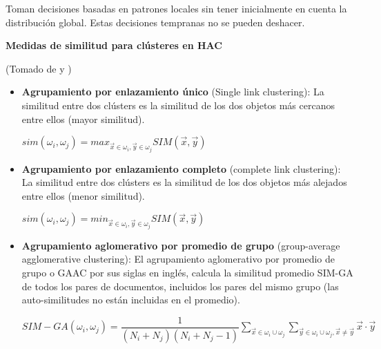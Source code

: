 \documentclass{llncs}
\begin{document}
Toman decisiones basadas en patrones locales sin tener inicialmente en cuenta la distribución global. Estas decisiones tempranas no se pueden deshacer.

\vspace{1em}
\textbf{Medidas de similitud para cl\'usteres en HAC}

\begin{flushright}
	\scriptsize*(Tomado de \cite{B1} y \cite{B3})
	\normalsize
\end{flushright}

\begin{itemize}
	\item \textbf{Agrupamiento por enlazamiento \'unico} (Single link clustering): La similitud entre dos cl\'usters es la similitud de los dos objetos más cercanos entre ellos (mayor similitud).
	
	\begin{center}
		$ sim(\omega_{i}, \omega_{j}) = max_{\overrightarrow{x} \in \omega_{i}, \overrightarrow{y} \in \omega_{j}} SIM(\overrightarrow{x}, \overrightarrow{y})$
	\end{center}
	
	\vspace{1em}
	\item \textbf{Agrupamiento por enlazamiento completo} (complete link clustering): La similitud entre dos cl\'usters es la similitud de los dos objetos más alejados entre ellos (menor similitud). 
	
	\begin{center}
		$ sim(\omega_{i}, \omega_{j}) = min_{\overrightarrow{x} \in \omega_{i}, \overrightarrow{y} \in \omega_{j}} SIM(\overrightarrow{x}, \overrightarrow{y})$
	\end{center}
	
	\vspace{1em}
	\item \textbf{Agrupamiento aglomerativo por promedio de grupo} (group-average agglomerative clustering): El agrupamiento aglomerativo por promedio de grupo o GAAC por sus siglas en ingl\'es, calcula la similitud promedio SIM-GA de todos los pares de documentos, incluidos los pares del mismo grupo (las auto-similitudes no están incluidas en el promedio).
	
	\begin{center}
	\footnotesize
	$ SIM-GA(\omega_{i}, \omega_{j}) = \dfrac{1}{(N_{i} + N_{j})(N_{i} + N_{j} - 1)} \sum_{\overrightarrow{x} \in \omega_{i} \cup \omega_{j}} \sum_{\overrightarrow{y} \in \omega_{i} \cup \omega_{j}, \overrightarrow{x} \neq \overrightarrow{y}} \overrightarrow{x} \cdot \overrightarrow{y} $
	\end{center}
	

\end{itemize}
\end{document}
